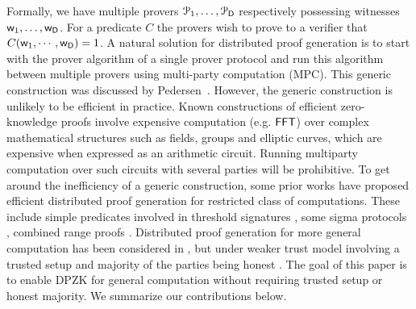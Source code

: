 Formally, we have multiple provers $\mathcal{P}_1, \ldots, \mathcal{P}_{\mathsf{D}}$
respectively possessing witnesses $\mathsf{w}_1, \ldots, \mathsf{w}_{\mathsf{D}}$. For a predicate $C$ the provers wish to prove to a verifier that $C(\mathsf{w}_1,\cdots,\mathsf{w}_{\mathsf{D}}) = 1$.  
A natural solution for distributed
proof generation is to start with the prover algorithm of a single prover
protocol and run this algorithm between multiple provers using multi-party computation (MPC). This generic construction was discussed by Pedersen~\cite{Ped92}. 
{\color{blue}
However, the generic construction is unlikely to be efficient in practice. Known constructions of efficient zero-knowledge proofs involve
expensive computation (e.g. $\mathsf{FFT}$) over complex mathematical structures such as fields, groups and elliptic curves, which are expensive when expressed
as an arithmetic circuit. Running multiparty computation over such circuits with several parties will be prohibitive. 
To get around the inefficiency of a generic construction, some prior works have proposed efficient distributed proof generation for 
restricted class of computations.
These include simple predicates involved in threshold signatures \cite{DDS}, some sigma protocols \cite{EfficientTZ}, 
combined range proofs \cite{bulletproofs}. Distributed proof generation for more general computation has been considered in \cite{trinocchio}, but under
weaker trust model involving a trusted setup and majority of the parties
being honest \cite{trinocchio}. The goal of this paper is to enable DPZK for general computation without requiring trusted setup or honest majority. 
We summarize our contributions below.
}
